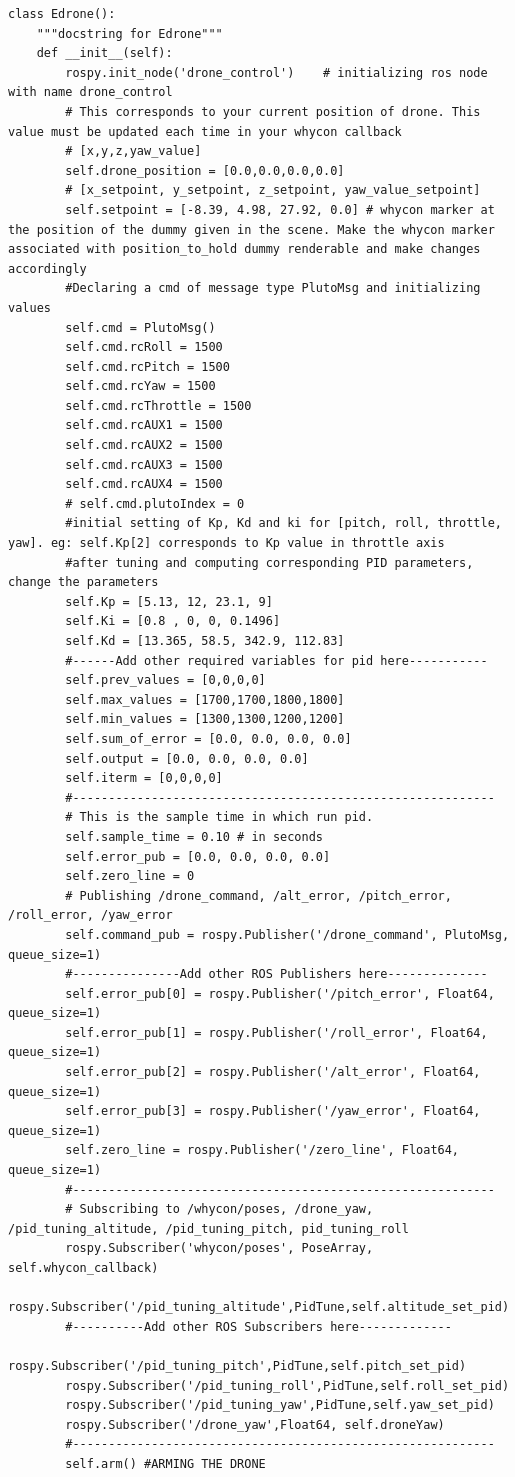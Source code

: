 \begin{verbatim}
class Edrone():
	"""docstring for Edrone"""
	def __init__(self):
		rospy.init_node('drone_control')	# initializing ros node with name drone_control
		# This corresponds to your current position of drone. This value must be updated each time in your whycon callback
		# [x,y,z,yaw_value]
		self.drone_position = [0.0,0.0,0.0,0.0]	
		# [x_setpoint, y_setpoint, z_setpoint, yaw_value_setpoint]
		self.setpoint = [-8.39, 4.98, 27.92, 0.0] # whycon marker at the position of the dummy given in the scene. Make the whycon marker associated with position_to_hold dummy renderable and make changes accordingly
		#Declaring a cmd of message type PlutoMsg and initializing values
		self.cmd = PlutoMsg()
		self.cmd.rcRoll = 1500
		self.cmd.rcPitch = 1500
		self.cmd.rcYaw = 1500
		self.cmd.rcThrottle = 1500
		self.cmd.rcAUX1 = 1500
		self.cmd.rcAUX2 = 1500
		self.cmd.rcAUX3 = 1500
		self.cmd.rcAUX4 = 1500
		# self.cmd.plutoIndex = 0
		#initial setting of Kp, Kd and ki for [pitch, roll, throttle, yaw]. eg: self.Kp[2] corresponds to Kp value in throttle axis
		#after tuning and computing corresponding PID parameters, change the parameters
		self.Kp = [5.13, 12, 23.1, 9]
		self.Ki = [0.8 , 0, 0, 0.1496]
		self.Kd = [13.365, 58.5, 342.9, 112.83]
		#------Add other required variables for pid here-----------
		self.prev_values = [0,0,0,0]
		self.max_values = [1700,1700,1800,1800]
		self.min_values = [1300,1300,1200,1200]
		self.sum_of_error = [0.0, 0.0, 0.0, 0.0]
		self.output = [0.0, 0.0, 0.0, 0.0]
		self.iterm = [0,0,0,0]
		#-----------------------------------------------------------
		# This is the sample time in which run pid.
		self.sample_time = 0.10 # in seconds
		self.error_pub = [0.0, 0.0, 0.0, 0.0]
		self.zero_line = 0
		# Publishing /drone_command, /alt_error, /pitch_error, /roll_error, /yaw_error
		self.command_pub = rospy.Publisher('/drone_command', PlutoMsg, queue_size=1)
		#---------------Add other ROS Publishers here--------------
		self.error_pub[0] = rospy.Publisher('/pitch_error', Float64, queue_size=1)
		self.error_pub[1] = rospy.Publisher('/roll_error', Float64, queue_size=1)
		self.error_pub[2] = rospy.Publisher('/alt_error', Float64, queue_size=1)
		self.error_pub[3] = rospy.Publisher('/yaw_error', Float64, queue_size=1)
		self.zero_line = rospy.Publisher('/zero_line', Float64, queue_size=1)
		#-----------------------------------------------------------
		# Subscribing to /whycon/poses, /drone_yaw, /pid_tuning_altitude, /pid_tuning_pitch, pid_tuning_roll
		rospy.Subscriber('whycon/poses', PoseArray, self.whycon_callback)
		rospy.Subscriber('/pid_tuning_altitude',PidTune,self.altitude_set_pid)
		#----------Add other ROS Subscribers here-------------
		rospy.Subscriber('/pid_tuning_pitch',PidTune,self.pitch_set_pid)
		rospy.Subscriber('/pid_tuning_roll',PidTune,self.roll_set_pid)
		rospy.Subscriber('/pid_tuning_yaw',PidTune,self.yaw_set_pid)
		rospy.Subscriber('/drone_yaw',Float64, self.droneYaw)
		#-----------------------------------------------------------
		self.arm() #ARMING THE DRONE
	

\end{verbatim}
